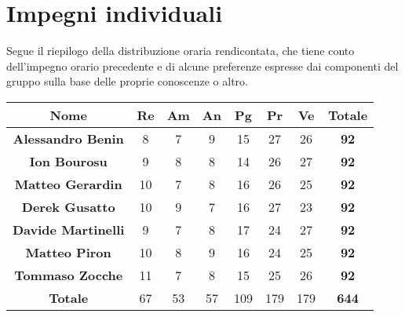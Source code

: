 


\section{Impegni individuali}
 Segue il riepilogo della distribuzione oraria rendicontata, che tiene conto dell'impegno orario precedente e di alcune preferenze espresse dai componenti del gruppo sulla base delle proprie conoscenze o altro.

\begin{table}[H]
    \centering
    \renewcommand{\arraystretch}{1.5}
    \begin{tabular}{|>{\bfseries}c|c|c|c|c|c|c|>{\bfseries}c|}
        \hline
        \rowcolor{gray!70} 
        \color{white}\textbf{Nome} & \color{white}\textbf{Re} & \color{white}\textbf{Am} & \color{white}\textbf{An} & \color{white}\textbf{Pg} & \color{white}\textbf{Pr} & \color{white}\textbf{Ve} & \color{white}\textbf{Totale} \\
        \hline
        \color{black}\textbf{Alessandro Benin} & 8 & 7 & 9 & 15 & 27 & 26 & 92 \\ 
        \hline
        \rowcolor{gray!10} %
        \color{black}\textbf{Ion Bourosu} & 9 & 8 & 8 & 14 & 26 & 27 & 92 \\ 
        \hline
        \color{black}\textbf{Matteo Gerardin} & 10 & 7 & 8 & 16 & 26 & 25 & 92 \\ 
        \hline
        \rowcolor{gray!10} %
        \color{black}\textbf{Derek Gusatto} & 10 & 9 & 7 & 16 & 27 & 23 & 92 \\ 
        \hline
         \color{black}\textbf{Davide Martinelli} & 9 & 7 & 8 & 17 & 24 & 27 & 92 \\ 
        \hline
        \rowcolor{gray!10} %
        \color{black}\textbf{Matteo Piron} & 10 & 8 & 9 & 16 & 24 & 25 & 92 \\ 
        \hline
        \color{black}\textbf{Tommaso Zocche} & 11 & 7 & 8 & 15 & 25 & 26 & 92 \\ 
        \hline
        \rowcolor{gray!70} 
        \color{white}\textbf{Totale} & \color{white}67 & \color{white}53 & \color{white}57 & \color{white}109 & \color{white}179 & \color{white}179 & \color{white}644 \\ 
        \hline
    \end{tabular}
    
\end{table}